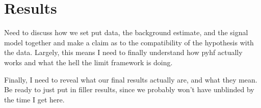 \chapter{Results}

Need to discuss how we set put data, the background estimate, and the signal model together
    and make a claim as to the compatibility of the hypothesis with the data.
Largely, this means I need to finally understand how pyhf actually works and what the hell the limit framework is doing.

Finally, I need to reveal what our final results actually are, and what they mean.
Be ready to just put in filler results, since we probably won't have unblinded by the time I get here.
